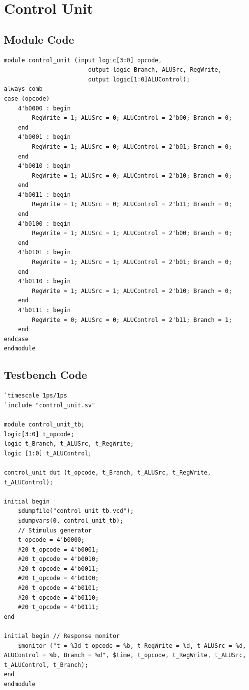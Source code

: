 \documentclass{article}
\begin{document}
\newpage
\section{Control Unit}
\subsection{Module Code}
\begin{lstlisting}
module control_unit (input logic[3:0] opcode,
                        output logic Branch, ALUSrc, RegWrite,
                        output logic[1:0]ALUControl);
always_comb
case (opcode)
    4'b0000 : begin
        RegWrite = 1; ALUSrc = 0; ALUControl = 2'b00; Branch = 0;
    end
    4'b0001 : begin
        RegWrite = 1; ALUSrc = 0; ALUControl = 2'b01; Branch = 0;
    end
    4'b0010 : begin
        RegWrite = 1; ALUSrc = 0; ALUControl = 2'b10; Branch = 0;
    end
    4'b0011 : begin
        RegWrite = 1; ALUSrc = 0; ALUControl = 2'b11; Branch = 0;
    end
    4'b0100 : begin
        RegWrite = 1; ALUSrc = 1; ALUControl = 2'b00; Branch = 0;
    end
    4'b0101 : begin
        RegWrite = 1; ALUSrc = 1; ALUControl = 2'b01; Branch = 0;
    end
    4'b0110 : begin
        RegWrite = 1; ALUSrc = 1; ALUControl = 2'b10; Branch = 0;
    end
    4'b0111 : begin
        RegWrite = 0; ALUSrc = 0; ALUControl = 2'b11; Branch = 1;
    end
endcase
endmodule
\end{lstlisting}
\subsection{Testbench Code}
\begin{lstlisting}
`timescale 1ps/1ps
`include "control_unit.sv"

module control_unit_tb;
logic[3:0] t_opcode;
logic t_Branch, t_ALUSrc, t_RegWrite;
logic [1:0] t_ALUControl;

control_unit dut (t_opcode, t_Branch, t_ALUSrc, t_RegWrite, t_ALUControl);

initial begin
    $dumpfile("control_unit_tb.vcd"); 
    $dumpvars(0, control_unit_tb);
    // Stimulus generator
    t_opcode = 4'b0000;
    #20 t_opcode = 4'b0001;
    #20 t_opcode = 4'b0010;
    #20 t_opcode = 4'b0011;
    #20 t_opcode = 4'b0100;
    #20 t_opcode = 4'b0101;
    #20 t_opcode = 4'b0110;
    #20 t_opcode = 4'b0111;
end

initial begin // Response monitor
    $monitor ("t = %3d t_opcode = %b, t_RegWrite = %d, t_ALUSrc = %d, ALUControl = %b, Branch = %d", $time, t_opcode, t_RegWrite, t_ALUSrc, t_ALUControl, t_Branch);
end
endmodule
\end{lstlisting}
\end{document}
